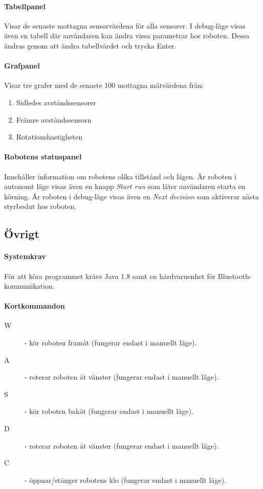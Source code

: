 \documentclass[11pt]{article}
\begin{document}
\paragraph{Tabellpanel} Visar de senaste mottagna sensorvärdena för alla sensorer. I debug-läge visas även en tabell där användaren kan ändra vissa parametrar hos roboten. Dessa ändras genom att ändra tabellvärdet och trycka Enter.

\paragraph{Grafpanel}
Visar tre grafer med  de senaste 100 mottagna mätvärdena från:
\begin{enumerate}
	\item Sidledes avståndssensorer
	\item Främre avståndssensorn
	\item Rotationshastigheten
\end{enumerate}

\paragraph{Robotens statuspanel}
Innehåller information om robotens olika tillstånd och lägen. Är roboten i autonomt läge visas även en knapp \emph{Start run} som låter användaren starta en körning. Är roboten i debug-läge visas även en \emph{Next decision} som aktiverar nästa styrbeslut hos roboten. 

\subsection{Övrigt}
\paragraph{Systemkrav} För att köra programmet krävs Java 1.8 samt en hårdvaruenhet för Bluetooth\textsuperscript{\circledR}-kommunikation.
\paragraph{Kortkommandon}\label{kortkommandon}
\begin{description}
	\item[W] - kör roboten framåt (fungerar endast i manuellt läge).
	\item[A] - roterar roboten åt vänster (fungerar endast i manuellt läge).
	\item[S] - kör roboten bakåt (fungerar endast i manuellt läge).
	\item[D] - roterar roboten åt vänster (fungerar endast i manuellt läge).
	\item[C] - öppnar/stänger robotens klo (fungerar endast i manuellt läge).
\end{description}
\end{document}
